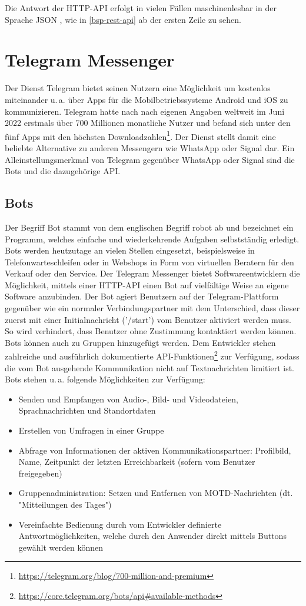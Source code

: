 Die Antwort der HTTP-API erfolgt in vielen Fällen maschinenlesbar in der Sprache JSON \cite[S. 281]{swdev}, wie in \autoref{bsp-rest-api} ab der ersten Zeile zu sehen.

\section{Telegram Messenger}

Der Dienst Telegram bietet seinen Nutzern eine Möglichkeit um kostenlos miteinander u.\,a. über Apps für die Mobilbetriebssysteme Android und iOS zu kommunizieren. Telegram hatte nach nach eigenen Angaben weltweit im Juni 2022 erstmals über 700 Millionen monatliche Nutzer und befand sich unter den fünf Apps mit den höchsten Downloadzahlen\footnote{\url{https://telegram.org/blog/700-million-and-premium}}. Der Dienst stellt damit eine beliebte Alternative zu anderen Messengern wie WhatsApp oder Signal dar. Ein Alleinstellungsmerkmal von Telegram gegenüber WhatsApp oder Signal sind die Bots und die dazugehörige API.

\subsection{Bots}

Der Begriff Bot stammt von dem englischen Begriff robot ab und bezeichnet ein Programm, welches einfache und wiederkehrende Aufgaben selbstständig erledigt. Bots werden heutzutage an vielen Stellen eingesetzt, beispielsweise in Telefonwarteschleifen oder in Webshops in Form von virtuellen Beratern für den Verkauf oder den Service. Der Telegram Messenger bietet Softwareentwicklern die Möglichkeit, mittels einer HTTP-API einen Bot auf vielfältige Weise an eigene Software anzubinden. Der Bot agiert Benutzern auf der Telegram-Plattform gegenüber wie ein normaler Verbindungspartner mit dem Unterschied, dass dieser zuerst mit einer Initialnachricht ('/start') vom Benutzer aktiviert werden muss. So wird verhindert, dass  Benutzer ohne Zustimmung kontaktiert werden können. Bots können auch zu Gruppen hinzugefügt werden. Dem Entwickler stehen zahlreiche und ausführlich dokumentierte API-Funktionen\footnote{\url{https://core.telegram.org/bots/api\#available-methods}} zur Verfügung, sodass die vom Bot ausgehende Kommunikation nicht auf Textnachrichten limitiert ist. Bots stehen u.\,a. folgende Möglichkeiten zur Verfügung:

\begin{itemize}
\item Senden und Empfangen von Audio-, Bild- und Videodateien, Sprachnachrichten und Standortdaten
\item Erstellen von Umfragen in einer Gruppe
\item Abfrage von Informationen der aktiven Kommunikationspartner: Profilbild, Name, Zeitpunkt der letzten Erreichbarkeit (sofern vom Benutzer freigegeben)
\item Gruppenadministration: Setzen und Entfernen von MOTD-Nachrichten (dt. "Mitteilungen des Tages")
\item Vereinfachte Bedienung durch vom Entwickler definierte Antwortmöglichkeiten, welche durch den Anwender direkt mittels Buttons gewählt werden können
\end{itemize}

